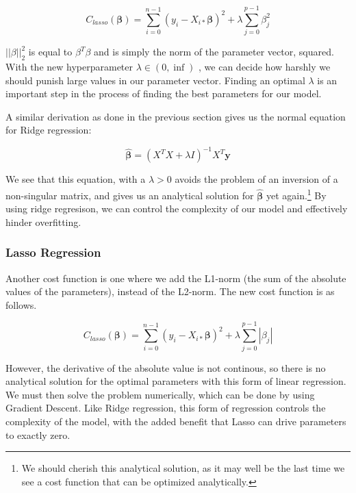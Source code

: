 \documentclass[twocolumn,10pt,cleanfoot]{asme2ej}
\begin{document}
\begin{equation}
	C_{lasso}(\bm{\beta}) = \sum_{i=0}^{n-1}(y_i-X_{i*}\bm{\beta})^2 + \lambda \sum_{j=0}^{p-1} \beta_j^2
\end{equation}

$||\beta||_2^2$ is equal to $\beta^T\beta$ and is simply the norm of the parameter vector, squared. With the new hyperparameter $\lambda \in (0, \inf)$ , we can decide how harshly we should punish large values in our parameter vector. Finding an optimal $\lambda$ is an important step in the process of finding the best parameters for our model.

A similar derivation as done in the previous section gives us the normal equation for Ridge regression:

\begin{equation}
	\bm{\hat{\beta}} = (X^TX + \lambda I)^{-1}X^T\bm{y}
\end{equation}

We see that this equation, with a $\lambda > 0$ avoids the problem of an inversion of a non-singular matrix, and gives us an analytical solution for $\bm{\hat{\beta}}$ yet again.\footnote{We should cherish this analytical solution, as it may well be the last time we see a cost function that can be optimized analytically.} By using ridge regresison, we can control the complexity of our model and effectively hinder overfitting.

\subsubsection{Lasso Regression}

Another cost function is one where we add the L1-norm (the sum of the absolute values of the parameters), instead of the L2-norm. The new cost function is as follows.

\begin{equation}
	C_{lasso}(\bm{\beta}) = \sum_{i=0}^{n-1}(y_i-X_{i*}\bm{\beta})^2 + \lambda \sum_{j=0}^{p-1} |\beta_j|
\end{equation}

However, the derivative of the absolute value is not continous, so there is no analytical solution for the optimal parameters with this form of linear regression. We must then solve the problem numerically, which can be done by using Gradient Descent. Like Ridge regression, this form of regression controls the complexity of the model, with the added benefit that Lasso can drive parameters to exactly zero.
\end{document}
